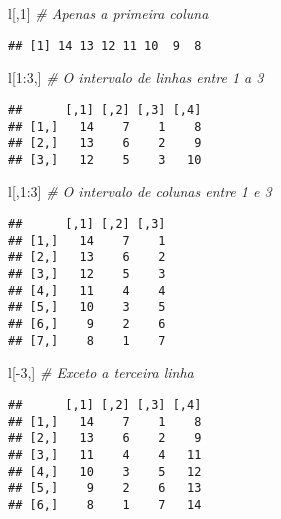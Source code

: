 \documentclass[
]{book}
\newenvironment{Shaded}{\begin{snugshade}}{\end{snugshade}}
\newcommand{\CommentTok}[1]{\textcolor[rgb]{0.56,0.35,0.01}{\textit{#1}}}
\newcommand{\DecValTok}[1]{\textcolor[rgb]{0.00,0.00,0.81}{#1}}
\newcommand{\NormalTok}[1]{#1}
\newcommand{\SpecialCharTok}[1]{\textcolor[rgb]{0.00,0.00,0.00}{#1}}
\begin{document}
\begin{Shaded}
\begin{Highlighting}[]
\NormalTok{l[,}\DecValTok{1}\NormalTok{] }\CommentTok{\# Apenas a primeira coluna}
\end{Highlighting}
\end{Shaded}

\begin{verbatim}
## [1] 14 13 12 11 10  9  8
\end{verbatim}

\begin{Shaded}
\begin{Highlighting}[]
\NormalTok{l[}\DecValTok{1}\SpecialCharTok{:}\DecValTok{3}\NormalTok{,] }\CommentTok{\# O intervalo de linhas entre 1 a 3}
\end{Highlighting}
\end{Shaded}

\begin{verbatim}
##      [,1] [,2] [,3] [,4]
## [1,]   14    7    1    8
## [2,]   13    6    2    9
## [3,]   12    5    3   10
\end{verbatim}

\begin{Shaded}
\begin{Highlighting}[]
\NormalTok{l[,}\DecValTok{1}\SpecialCharTok{:}\DecValTok{3}\NormalTok{] }\CommentTok{\# O intervalo de colunas entre 1 e 3}
\end{Highlighting}
\end{Shaded}

\begin{verbatim}
##      [,1] [,2] [,3]
## [1,]   14    7    1
## [2,]   13    6    2
## [3,]   12    5    3
## [4,]   11    4    4
## [5,]   10    3    5
## [6,]    9    2    6
## [7,]    8    1    7
\end{verbatim}

\begin{Shaded}
\begin{Highlighting}[]
\NormalTok{l[}\SpecialCharTok{{-}}\DecValTok{3}\NormalTok{,] }\CommentTok{\# Exceto a terceira linha}
\end{Highlighting}
\end{Shaded}

\begin{verbatim}
##      [,1] [,2] [,3] [,4]
## [1,]   14    7    1    8
## [2,]   13    6    2    9
## [3,]   11    4    4   11
## [4,]   10    3    5   12
## [5,]    9    2    6   13
## [6,]    8    1    7   14
\end{verbatim}
\end{document}
